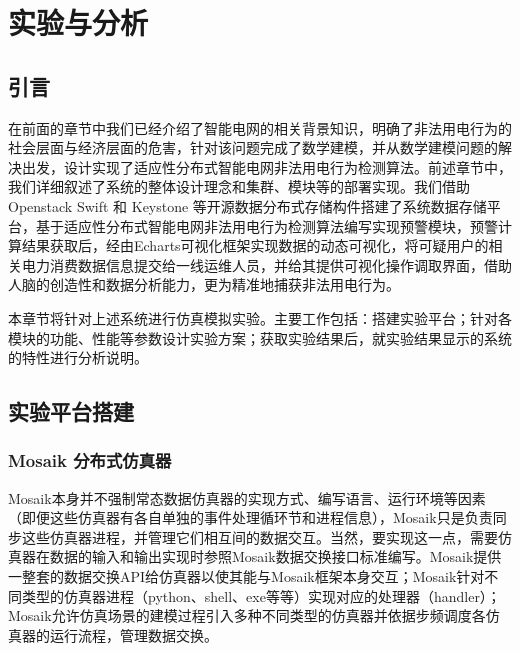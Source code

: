 
\raggedbottom
\chapter{实验与分析}
\label{chap:evaluation}



\section{引言}

在前面的章节中我们已经介绍了智能电网的相关背景知识，明确了非法用电行为的社会层面与经济层面的危害，针对该问题完成了数学建模，并从数学建模问题的解决出发，设计实现了适应性分布式智能电网非法用电行为检测算法。前述章节中，我们详细叙述了系统的整体设计理念和集群、模块等的部署实现。我们借助Openstack Swift 和 Keystone 等开源数据分布式存储构件搭建了系统数据存储平台，基于适应性分布式智能电网非法用电行为检测算法编写实现预警模块，预警计算结果获取后，经由Echarts可视化框架实现数据的动态可视化，将可疑用户的相关电力消费数据信息提交给一线运维人员，并给其提供可视化操作调取界面，借助人脑的创造性和数据分析能力，更为精准地捕获非法用电行为。

本章节将针对上述系统进行仿真模拟实验。主要工作包括：搭建实验平台；针对各模块的功能、性能等参数设计实验方案；获取实验结果后，就实验结果显示的系统的特性进行分析说明。

\section{实验平台搭建}

\subsection{Mosaik 分布式仿真器}



Mosaik本身并不强制常态数据仿真器的实现方式、编写语言、运行环境等因素（即便这些仿真器有各自单独的事件处理循环节和进程信息），Mosaik只是负责同步这些仿真器进程，并管理它们相互间的数据交互。当然，要实现这一点，需要仿真器在数据的输入和输出实现时参照Mosaik数据交换接口标准编写。Mosaik提供一整套的数据交换API给仿真器以使其能与Mosaik框架本身交互；Mosaik针对不同类型的仿真器进程（python、shell、exe等等）实现对应的处理器（handler）；Mosaik允许仿真场景的建模过程引入多种不同类型的仿真器并依据步频调度各仿真器的运行流程，管理数据交换。

